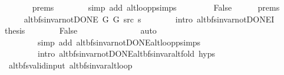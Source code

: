 \begin{isabellebody}
\ \ \ \ \ \ \isamarkupfalse%
\ {\isachardoublequoteopen}{}{\isachardot}{\kern0pt}prems{\isachardoublequoteclose}\isanewline
\ \ \ \ \ \ \isamarkupfalse%
\ {\isacharparenleft}{\kern0pt}simp\ add{\isacharcolon}{\kern0pt}\ alt{\isacharunderscore}{\kern0pt}loop{\isacharunderscore}{\kern0pt}psimps{\isacharparenright}{\kern0pt}\isanewline
\ \ \isamarkupfalse%
\isanewline
\ \ \ \ \isamarkupfalse%
\ False\isanewline
\ \ \ \ \isamarkupfalse%
\ {\isachardoublequoteopen}{}{\isachardot}{\kern0pt}prems{\isachardoublequoteclose}\isanewline
\ \ \ \ \isamarkupfalse%
\ {\isachardoublequoteopen}alt{\isacharunderscore}{\kern0pt}bfs{\isacharunderscore}{\kern0pt}invar{\isacharunderscore}{\kern0pt}not{\isacharunderscore}{\kern0pt}DONE{\isacharprime}{\kern0pt}\ G{}\ G{}\ src\ s{\isachardoublequoteclose}\isanewline
\ \ \ \ \ \ \isamarkupfalse%
\ {\isacharparenleft}{\kern0pt}intro\ alt{\isacharunderscore}{\kern0pt}bfs{\isacharunderscore}{\kern0pt}invar{\isacharunderscore}{\kern0pt}not{\isacharunderscore}{\kern0pt}DONE{\isacharprime}{\kern0pt}I{\isacharparenright}{\kern0pt}\isanewline
\ \ \ \ \isamarkupfalse%
\ {\isacharquery}{\kern0pt}thesis\isanewline
\ \ \ \ \ \ \isamarkupfalse%
\ False\isanewline
\ \ \ \ \ \ \isamarkupfalse%
\isanewline
\ \ \ \ \ \ \ \ {\isacharparenleft}{\kern0pt}auto\isanewline
\ \ \ \ \ \ \ \ \ simp\ add{\isacharcolon}{\kern0pt}\ alt{\isacharunderscore}{\kern0pt}bfs{\isacharunderscore}{\kern0pt}invar{\isacharunderscore}{\kern0pt}not{\isacharunderscore}{\kern0pt}DONE{\isachardot}{\kern0pt}alt{\isacharunderscore}{\kern0pt}loop{\isacharunderscore}{\kern0pt}psimps\isanewline
\ \ \ \ \ \ \ \ \ intro{\isacharcolon}{\kern0pt}\ alt{\isacharunderscore}{\kern0pt}bfs{\isacharunderscore}{\kern0pt}invar{\isacharunderscore}{\kern0pt}not{\isacharunderscore}{\kern0pt}DONE{\isachardot}{\kern0pt}alt{\isacharunderscore}{\kern0pt}bfs{\isacharunderscore}{\kern0pt}invar{\isacharunderscore}{\kern0pt}alt{\isacharunderscore}{\kern0pt}fold\ {\isachardoublequoteopen}{}{\isachardot}{\kern0pt}hyps{\isachardoublequoteclose}{\isacharparenright}{\kern0pt}\isanewline
\ \ \isamarkupfalse%
\isanewline
{}\isamarkupfalse%
%
\endisatagproof
{\isafoldproof}%
%
\isadelimproof
\isanewline
%
\endisadelimproof
\isanewline
{}\isamarkupfalse%
\ {\isacharparenleft}{\kern0pt}\ alt{\isacharunderscore}{\kern0pt}bfs{\isacharunderscore}{\kern0pt}valid{\isacharunderscore}{\kern0pt}input{\isacharparenright}{\kern0pt}\ alt{\isacharunderscore}{\kern0pt}bfs{\isacharunderscore}{\kern0pt}invar{\isacharunderscore}{\kern0pt}alt{\isacharunderscore}{\kern0pt}loop{\isacharcolon}{\kern0pt}\isanewline

\end{isabellebody}
